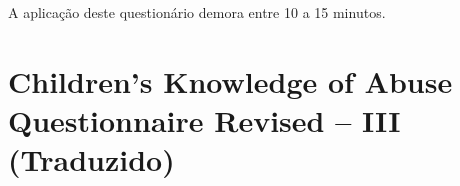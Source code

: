 \begin{apendicesenv}
\vspace{1.0cm}

\begin{center}
	A aplicação deste questionário demora entre 10 a 15 minutos.
\end{center}




\chapter{Children’s Knowledge of Abuse Questionnaire Revised – III  (Traduzido)}\label{chap:traduzido}

\hspace{-1.6cm}


\end{apendicesenv}
